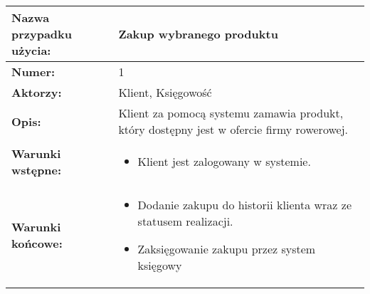 \documentclass[a4paper,20pt]{article}
\begin{document}
\begin{center}
\begin{tabularx}{\textwidth}[t]{XX}

\arrayrulecolor{black}\hline
\textbf{Nazwa przypadku użycia:} & \textbf{Zakup wybranego produktu} \\
\hline

\quad \textbf{Numer:} & 
\begin{minipage}[t]{\linewidth}%
1
\end{minipage}\\


\quad \textbf{Aktorzy:} & 
\begin{minipage}[t]{\linewidth}%
Klient, Księgowość
\end{minipage}\\


\quad \textbf{Opis:} & 
\begin{minipage}[t]{\linewidth}%
Klient za pomocą systemu zamawia produkt, który dostępny jest w ofercie firmy rowerowej. 
\end{minipage}\\


\quad \textbf{Warunki wstępne:} & 
\begin{minipage}[t]{\linewidth}%
\begin{itemize}
\item Klient jest zalogowany w systemie. 
\end{itemize}
\end{minipage}\\


\quad \textbf{Warunki końcowe:} & 
\begin{minipage}[t]{\linewidth}
\begin{itemize}
\item Dodanie zakupu do historii klienta wraz ze statusem realizacji. 
\item Zaksięgowanie zakupu przez system księgowy 
\end{itemize}

\end{minipage}\\



\end{tabularx}
\end{center}
\end{document}
